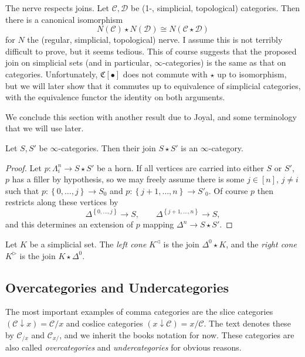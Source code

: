 The nerve respects joins. Let $\mathcal{C} ,\mathcal{D} $ be (1-, simplicial, topological) categories. Then there is a canonical isomorphism
\[
	N(\mathcal{C} )\star N(\mathcal{D} )\cong N(\mathcal{C} \star \mathcal{D} )
\]
for $N$ the (regular, simplicial, topological) nerve. I assume this is not terribly difficult to prove, but it seems tedious. This of course suggests that the proposed join on simplicial sets (and in particular, $\infty $-categories) is the same as that on categories. Unfortunately, $\mathfrak{C} [\bullet]$ does not commute with $\star $ up to isomorphism, but we will later show that it commutes up to equivalence of simplicial categories, with the equivalence functor the identity on both arguments.

We conclude this section with another result due to Joyal, and some terminology that we will use later.

\begin{proposition}\label{1.2.8.3}
	Let $S,S'$ be $\infty $-categories. Then their join $S\star S'$ is an $\infty $-category.
\end{proposition}
\begin{proof}
	Let $p : \Lambda _i^n \to S\star S'$ be a horn. If all vertices are carried into either $S$ or $S'$, $p$ has a filler by hypothesis, so we may freely assume there is some $j\in [n]$, $j\neq i$ such that $p : \left\{ 0, \ldots ,j \right\} \to S_0$ and $p : \left\{ j+1, \ldots , n \right\} \to S'_0$. Of course $p$ then restricts along these vertices by
	\[
		\Delta ^{\left\{ 0, \ldots ,j \right\} } \to S,\qquad \Delta ^{\left\{ j+1, \ldots ,n \right\} } \to S,
	\]
	and this determines an extension of $p$ mapping $\Delta ^n\to S\star S'$.
\end{proof}
\begin{definition}\label{1.2.8.4}
	Let $K$ be a simplicial set. The \emph{left cone} $K^{\lhd} $ is the join $\Delta ^0\star K$, and the \emph{right cone} $K^{\rhd} $ is the join $K\star \Delta ^0$.
\end{definition}

\subsection{Overcategories and Undercategories}

The most important examples of comma categories are the slice categories $(\mathcal{C} \downarrow x)=\mathcal{C} /x$ and coslice categories $(x\downarrow \mathcal{C} )=x /\mathcal{C} $. The text denotes these by $\mathcal{C} _{/x} $ and $\mathcal{C} _{x/} $, and we inherit the books notation for now. These categories are also called \emph{overcategories} and \emph{undercategories} for obvious reasons.

